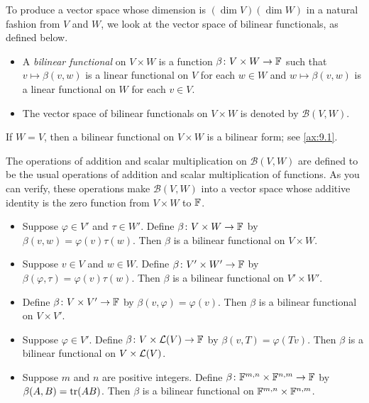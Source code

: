 To produce a vector space whose dimension is $(\dim V)(\dim W)$ in a natural
fashion from $V$ and $W$, we look at the vector space of bilinear functionals,
as defined below.

\begin{definition}\label{ax:9.68}\leavevmode
\begin{itemize}
\item A \emph{bilinear functional} on $V\times W$ is a function
  $\beta\colon V\times W\to\mathbb{F}$ such that $v\mapsto\beta(v,w)$ is a linear
  functional on $V$ for each $w\in W$ and $w\mapsto\beta(v,w)$ is a linear
  functional on $W$ for each $v\in V$.
\item The vector space of bilinear functionals on $V\times W$ is denoted by
  $\mathcal{B}(V,W)$.
\end{itemize}
\end{definition}

If $W=V$, then a bilinear functional on $V\times W$ is a bilinear form; see
\ref{ax:9.1}.

The operations of addition and scalar multiplication on $\mathcal{B}(V,W)$ are
defined to be the usual operations of addition and scalar multiplication of
functions. As you can verify, these operations make $\mathcal{B}(V,W)$ into a
vector space whose additive identity is the zero function from $V\times W$ to
$\mathbb{F}$.

\begin{example}\label{ax:9.69}\leavevmode
\begin{itemize}
\item Suppose $\varphi\in V'$ and $\tau\in W'$. Define
  $\beta\colon V\times W\to\mathbb{F}$ by $\beta(v,w)=\varphi(v)\tau(w)$. Then $\beta$
  is a bilinear functional on $V\times W$.
\item Suppose $v\in V$ and $w\in W$. Define $\beta\colon V'\times W'\to\mathbb{F}$ by
  $\beta(\varphi,\tau)=\varphi(v)\tau(w)$. Then $\beta$ is a bilinear
  functional on $V'\times W'$.
\item Define $\beta\colon V\times V'\to\mathbb{F}$ by $\beta(v,\varphi)=\varphi(v)$.
  Then $\beta$ is a bilinear functional on $V\times V'$.
\item Suppose $\varphi\in V'$. Define $\beta\colon V\times\mathcal{L}(V)\to\mathbb{F}$ by
  $\beta(v,T)=\varphi(Tv)$. Then $\beta$ is a bilinear functional on
  $V\times\mathcal{L}(V)$.
\item Suppose $m$ and $n$ are positive integers. Define
  $\beta\colon\mathbb{F}^{m,n}\times\mathbb{F}^{n,m}\to\mathbb{F}$ by $\beta(A,B)=\operatorname{tr}(AB)$. Then
  $\beta$ is a bilinear functional on $\mathbb{F}^{m,n}\times\mathbb{F}^{n,m}$.
\end{itemize}
\end{example}

